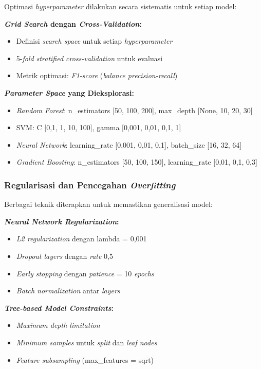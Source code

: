 Optimasi \textit{hyperparameter} dilakukan secara sistematis untuk setiap model:

\textbf{\textit{Grid Search} dengan \textit{Cross-Validation}:}
\begin{itemize}
    \item Definisi \textit{search space} untuk setiap \textit{hyperparameter}
    \item 5-\textit{fold stratified cross-validation} untuk evaluasi
    \item Metrik optimasi: \textit{F1-score} (\textit{balance precision-recall})
\end{itemize}

\textbf{\textit{Parameter Space} yang Dieksplorasi:}
\begin{itemize}
    \item \textit{Random Forest}: n\_estimators [50, 100, 200], max\_depth [None, 10, 20, 30]
    \item SVM: C [0,1, 1, 10, 100], gamma [0,001, 0,01, 0,1, 1]
    \item \textit{Neural Network}: learning\_rate [0,001, 0,01, 0,1], batch\_size [16, 32, 64]
    \item \textit{Gradient Boosting}: n\_estimators [50, 100, 150], learning\_rate [0,01, 0,1, 0,3]
\end{itemize}

\subsubsection{Regularisasi dan Pencegahan \textit{Overfitting}}
\label{sec:regularisasi}

Berbagai teknik diterapkan untuk memastikan generalisasi model:

\textbf{\textit{Neural Network Regularization}:}
\begin{itemize}
    \item \textit{L2 regularization} dengan lambda = 0,001
    \item \textit{Dropout layers} dengan \textit{rate} 0,5
    \item \textit{Early stopping} dengan \textit{patience} = 10 \textit{epochs}
    \item \textit{Batch normalization} antar \textit{layers}
\end{itemize}

\textbf{\textit{Tree-based Model Constraints}:}
\begin{itemize}
    \item \textit{Maximum depth limitation}
    \item \textit{Minimum samples} untuk \textit{split} dan \textit{leaf nodes}
    \item \textit{Feature subsampling} (max\_features = sqrt)
\end{itemize}

